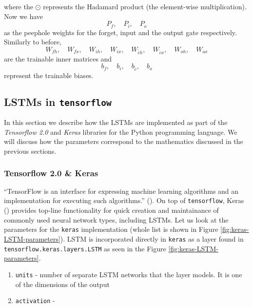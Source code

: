 where the $\odot$ represents the Hadamard product (the element-wise multiplication). Now we have 
$$ P_f, \quad P_i, \quad P_o $$
as the peephole weights for the forget, input and the output gate respectively. Similarly to before, 
$$ W_{fh}, \quad W_{fx}, \quad W_{ih}, \quad W_{ix}, \quad W_{\tilde{c}h}, \quad W_{\tilde{c}x}, \quad W_{oh}, \quad W_{ox} $$
are the trainable inner matrices and
$$ b_f, \quad b_i, \quad b_{\tilde{c}}, \quad b_o $$
represent the trainable biases.

\newpage
\subsection*{LSTMs in \texttt{tensorflow}}
In this section we describe how the LSTMs are implemented as part of the \textit{Tensorflow 2.0} and \textit{Keras} libraries for the Python programming language. We will discuss how the parameters correspond to the mathematics discussed in the previous sections.

\subsubsection*{Tensorflow 2.0 \& Keras}
``TensorFlow is an interface for expressing machine learning algorithms and an implementation for executing such algorithms.'' (\cite{abadiTensorFlowLargeScaleMachine}). On top of \texttt{tensorflow}, Keras (\cite{chollet2015keras}) provides top-line functionality for quick creation and maintainance of commonly used neural network types, including LSTMs. Let us look at the parameters for the \texttt{keras} implementation (whole list is shown in Figure \ref{fig:keras-LSTM-parameters}). LSTM is incorporated directly in \texttt{keras} as a layer found in \texttt{tensorflow.keras.layers.LSTM} as seen in the Figure \ref{fig:keras-LSTM-parameters}.

\begin{enumerate}
    \item \texttt{units} - number of separate LSTM networks that the layer models. It is one of the dimensions of the output
    \item \texttt{activation} - 
\end{enumerate}


